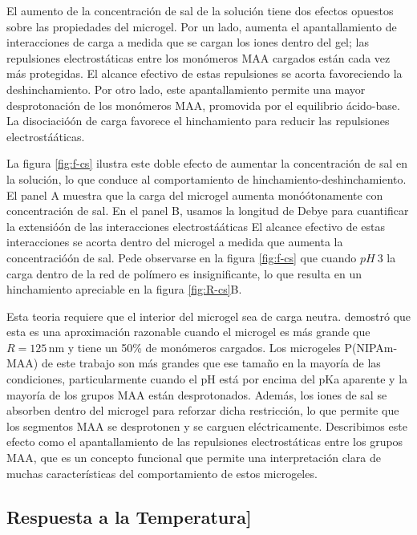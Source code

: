 El aumento de la concentraci\'on de sal de la soluci\'on tiene dos efectos opuestos sobre las propiedades del microgel.
Por un lado, aumenta el apantallamiento de interacciones de carga a medida que se cargan los iones dentro del gel; las repulsiones electrost\'aticas entre los mon\'omeros MAA cargados est\'an cada vez m\'as protegidas.
El alcance efectivo de estas repulsiones se acorta favoreciendo la deshinchamiento.
Por otro lado, este apantallamiento permite una mayor desprotonaci\'on de los mon\'omeros MAA, promovida por el equilibrio \'acido-base.
La disociació\'on de carga favorece el hinchamiento para reducir las repulsiones electrostá\'aticas.


La figura \ref{fig:f-cs} ilustra este doble efecto de aumentar la concentraci\'on de sal en la soluci\'on, lo que conduce al comportamiento de hinchamiento-deshinchamiento.
El panel A muestra que la carga del microgel aumenta monó\'otonamente con concentraci\'on de sal.
En el panel B, usamos la longitud de Debye para cuantificar la extensió\'on de las interacciones electrostá\'aticas %
El alcance efectivo de estas interacciones se acorta dentro del microgel a medida que aumenta la concentració\'on de sal.
Pede observarse en la figura \ref{fig:f-cs} que cuando $pH~3$ la carga dentro de la red de polímero es insignificante, lo que resulta en un hinchamiento apreciable en la figura \ref{fig:R-cs}B.



Esta teoria requiere que el interior del microgel sea de carga neutra.
 demostr\'o que esta es una aproximación razonable cuando el microgel es m\'as grande que $R=125\,\text{nm}$ y tiene un 50\% de mon\'omeros cargados.
Los microgeles P(NIPAm-MAA) de este trabajo son m\'as grandes que ese tama\~no en la mayor\'ia de las condiciones, particularmente cuando el pH está por encima del pKa aparente y la mayor\'ia de los grupos MAA est\'an desprotonados.
Adem\'as, los iones de sal se absorben dentro del microgel para reforzar dicha restricci\'on, lo que permite que los segmentos MAA se desprotonen y se carguen el\'ectricamente.
Describimos este efecto como el apantallamiento de las repulsiones electrost\'aticas entre los grupos MAA, que es un concepto funcional que permite una interpretaci\'on clara de muchas caracter\'isticas del comportamiento de estos microgeles. %




\subsection{Respuesta a la Temperatura]}\label{sec:temperature}

